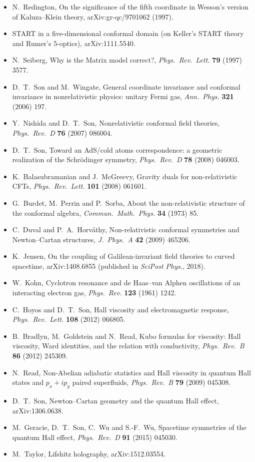 \begin{itemize}
      \emph{Zh.\ Eksp.\ Teor.\ Fiz.} \textbf{19} (1949); and
      \emph{Issledovaniya po 5-optike} (Studies on 5-optics) (Gostekhizdat,
      Moscow, 1956).
\item N.~Redington, On the significance of the fifth coordinate in Wesson's
      version of Kaluza--Klein theory, arXiv:gr-qc/9701062 (1997).
\item START in a five-dimensional conformal domain (on Keller's START theory and
      Rumer's 5-optics), arXiv:1111.5540.
\item N.~Seiberg, Why is the Matrix model correct?,
      \emph{Phys.\ Rev.\ Lett.} \textbf{79} (1997) 3577.
\item D.~T.~Son and M.~Wingate, General coordinate invariance and conformal
      invariance in nonrelativistic physics: unitary Fermi gas,
      \emph{Ann.\ Phys.} \textbf{321} (2006) 197.
\item Y.~Nishida and D.~T.~Son, Nonrelativistic conformal field theories,
      \emph{Phys.\ Rev.\ D} \textbf{76} (2007) 086004.
\item D.~T.~Son, Toward an AdS/cold atoms correspondence: a geometric
      realization of the Schr\"odinger symmetry, \emph{Phys.\ Rev.\ D}
      \textbf{78} (2008) 046003.
\item K.~Balasubramanian and J.~McGreevy, Gravity duals for non-relativistic CFTs,
      \emph{Phys.\ Rev.\ Lett.} \textbf{101} (2008) 061601.
\item G.~Burdet, M.~Perrin and P.~Sorba, About the non-relativistic structure of
      the conformal algebra, \emph{Commun.\ Math.\ Phys.} \textbf{34} (1973) 85.
\item C.~Duval and P.~A.~Horv\'athy, Non-relativistic conformal symmetries and
      Newton--Cartan structures, \emph{J.\ Phys.\ A} \textbf{42} (2009) 465206.
\item K.~Jensen, On the coupling of Galilean-invariant field theories to curved
      spacetime, arXiv:1408.6855 (published in \emph{SciPost Phys.}, 2018).
\item W.~Kohn, Cyclotron resonance and de Haas--van Alphen oscillations of an
      interacting electron gas, \emph{Phys.\ Rev.} \textbf{123} (1961) 1242.
\item C.~Hoyos and D.~T.~Son, Hall viscosity and electromagnetic response,
      \emph{Phys.\ Rev.\ Lett.} \textbf{108} (2012) 066805.
\item B.~Bradlyn, M.~Goldstein and N.~Read, Kubo formulas for viscosity: Hall
      viscosity, Ward identities, and the relation with conductivity,
      \emph{Phys.\ Rev.\ B} \textbf{86} (2012) 245309.
\item N.~Read, Non-Abelian adiabatic statistics and Hall viscosity in quantum Hall
      states and $p_x+ip_y$ paired superfluids, \emph{Phys.\ Rev.\ B}
      \textbf{79} (2009) 045308.
\item D.~T.~Son, Newton--Cartan geometry and the quantum Hall effect,
      arXiv:1306.0638.
\item M.~Geracie, D.~T.~Son, C.~Wu and S.-F.~Wu, Spacetime symmetries of the
      quantum Hall effect, \emph{Phys.\ Rev.\ D} \textbf{91} (2015) 045030.
\item M.~Taylor, Lifshitz holography, arXiv:1512.03554.
\end{itemize}
